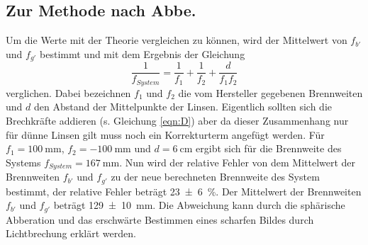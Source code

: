 \subsection{Zur Methode nach Abbe.}
Um die Werte mit der Theorie vergleichen zu können, wird der Mittelwert
von $f_{b'}$ und $f_{g'}$ bestimmt und mit dem Ergebnis der Gleichung
\begin{equation*}
  \frac{1}{f_{System}} = \frac{1}{f_{1}} + \frac{1}{f_{2}} + \frac{d}{f_{1} f_{2}}
\end{equation*}
verglichen. Dabei bezeichnen $f_1$ und $f_2$ die vom Hersteller gegebenen
Brennweiten und $d$ den Abstand der Mittelpunkte der Linsen. Eigentlich
sollten sich die Brechkräfte addieren (s. Gleichung \eqref{eqn:D}) aber
da dieser Zusammenhang nur für dünne Linsen gilt muss noch ein Korrekturterm
angefügt werden.
Für $f_1 = \SI{100}{\milli\meter}$, $f_2 = \SI{-100}{\milli\meter}$ und
$d = \SI{6}{\centi\meter}$ ergibt sich für die Brennweite des
Systems $f_{System} =\SI{167}{\milli\meter}$. Nun wird der relative
Fehler von dem Mittelwert der Brennweiten $f_{b'}$ und $f_{g'}$ zu der
neue berechneten Brennweite des System bestimmt, der relative Fehler beträgt
\SI{23(6)}{\percent}. Der Mittelwert der Brennweiten $f_{b'}$ und $f_{g'}$
beträgt \SI{129(10)}{\milli\meter}. Die Abweichung kann durch die sphärische
Abberation und das erschwärte Bestimmen eines scharfen Bildes durch Lichtbrechung
erklärt werden.
